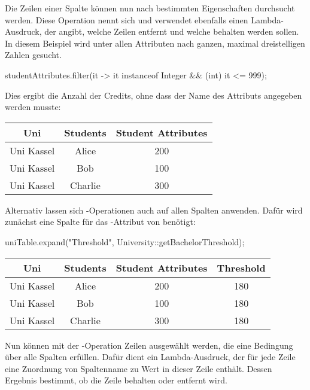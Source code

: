 Die Zeilen einer Spalte können nun nach bestimmten Eigenschaften durchsucht werden.
Diese Operation nennt sich  und verwendet ebenfalls einen Lambda-Ausdruck,
der angibt, welche Zeilen entfernt und welche behalten werden sollen.
In diesem Beispiel wird unter allen Attributen nach ganzen, maximal dreistelligen Zahlen gesucht.

\begin{jcodeblock}
    studentAttributes.filter(it -> it instanceof Integer && (int) it <= 999);
\end{jcodeblock}

Dies ergibt die Anzahl der Credits, ohne dass der Name des Attributs angegeben werden musste:

\begin{tabular}{|c|c|c|}
    \hline
    \textbf{Uni} & \textbf{Students} & \textbf{Student Attributes} \\
    \hline
    Uni Kassel & Alice   & 200 \\
    Uni Kassel & Bob     & 100 \\
    Uni Kassel & Charlie & 300 \\
    \hline
\end{tabular}

Alternativ lassen sich -Operationen auch auf allen Spalten anwenden.
Dafür wird zunächst eine Spalte für das -Attribut von  benötigt:

\begin{jcodeblock}
    uniTable.expand("Threshold", University::getBachelorThreshold);
\end{jcodeblock}

\begin{tabular}{|c|c|c|c|}
    \hline
    \textbf{Uni} & \textbf{Students} & \textbf{Student Attributes} & \textbf{Threshold} \\
    \hline
    Uni Kassel & Alice   & 200 & 180 \\
    Uni Kassel & Bob     & 100 & 180 \\
    Uni Kassel & Charlie & 300 & 180 \\
    \hline
\end{tabular}

Nun können mit der -Operation Zeilen ausgewählt werden, die eine Bedingung über alle Spalten erfüllen.
Dafür dient ein Lambda-Ausdruck, der für jede Zeile eine Zuordnung von Spaltenname zu Wert in dieser Zeile enthält.
Dessen Ergebnis bestimmt, ob die Zeile behalten oder entfernt wird.

